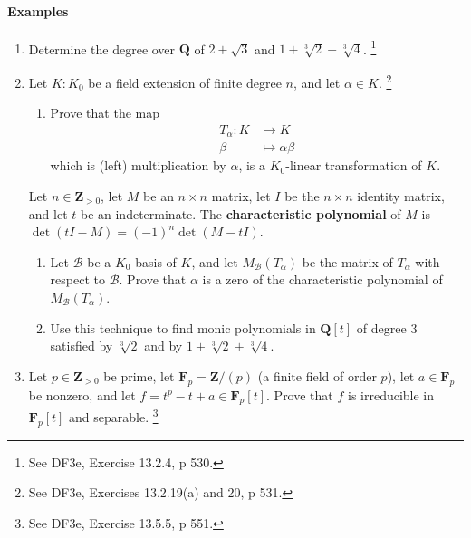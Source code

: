 \documentclass[oneside, english, 11pt]{article}
\newcommand{\fontDefWord}[1]{\textbf{#1}}
\newcommand{\fontField}[1]{\mathbf{#1}}
\newcommand{\integers}{\fontField{Z}}
\newcommand{\integersPositive}{\integers_{> 0}}
\newcommand{\Q}{\rationals}
\newcommand{\rationals}{\fontField{Q}}
\newcommand{\Z}{\integers}
\begin{document}
\paragraph{Examples}

\begin{enumerate}[resume, label=(\alph*)]
\item\label{itm : EH06e} Determine the degree over $\Q$ of $2 + \sqrt{3}$ and $1 + \sqrt[3]{2} + \sqrt[3]{4}$.%
\footnote{See DF3e, Exercise 13.2.4, p 530.}%
\item\label{itm : EH06f} Let $K : K_{0}$ be a field extension of finite degree $n$, and let $\alpha \in K$.%
\footnote{See DF3e, Exercises 13.2.19(a) and 20, p 531.}%
\begin{enumerate}[label=(\roman*)]
\item\label{itm : EH06f1} Prove that the map
\begin{align*}
T_{\alpha}
:
K
&\rightarrow
K
\\
\beta
&\mapsto
\alpha \beta
\end{align*}
which is (left) multiplication by $\alpha$, is a $K_{0}$-linear transformation of $K$.
\end{enumerate}
Let $n \in \integersPositive$, let $M$ be an $n \times n$ matrix, let $I$ be the $n \times n$ identity matrix, and let $t$ be an indeterminate. The \fontDefWord{characteristic polynomial} of $M$ is $\det(t I - M) = (-1)^{n} \det(M - t I)$.
\begin{enumerate}[resume, label=(\roman*)]
\item\label{itm : EH06f2} Let $\mathcal{B}$ be a $K_{0}$-basis of $K$, and let $M_{\mathcal{B}}(T_{\alpha})$ be the matrix of $T_{\alpha}$ with respect to $\mathcal{B}$. Prove that $\alpha$ is a zero of the characteristic polynomial of $M_{\mathcal{B}}(T_{\alpha})$.
\item\label{itm : EH06f3} Use this technique to find monic polynomials in $\Q[t]$ of degree $3$ satisfied by $\sqrt[3]{2}$ and by $1 + \sqrt[3]{2} + \sqrt[3]{4}$.
\end{enumerate}
\item\label{itm : EH06g} Let $p \in \integersPositive$ be prime, let $\fontField{F}_{p} = \Z / (p)$ (a finite field of order $p$), let $a \in \fontField{F}_{p}$ be nonzero, and let $f = t^{p} - t + a \in \fontField{F}_{p}[t]$. Prove that $f$ is irreducible in $\fontField{F}_{p}[t]$ and separable.%
\footnote{See DF3e, Exercise 13.5.5, p 551.}%
\end{enumerate}
\end{document}
